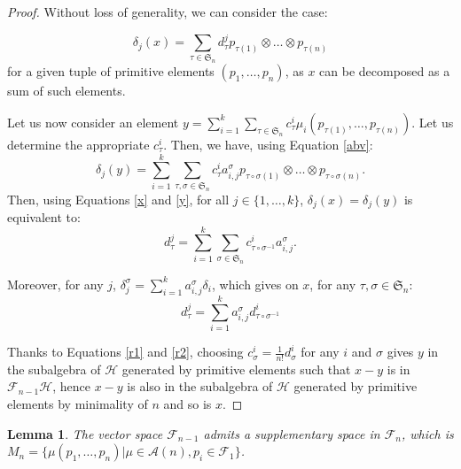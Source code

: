 \documentclass[11pt,leqno]{amsart}
\theoremstyle{definition}
\theoremstyle{plain}
\newtheorem{lemma}[definition]{Lemma}
\newcommand{\A}{ \mathcal{A} }
\newcommand{\F}{ \mathcal{F} }
\begin{document}
\begin{proof}
Without loss of generality, we can consider the case:
 
\begin{equation} \label{x}
\delta_j(x)=\sum_{\tau \in \mathfrak{S}_n} d^j_{\tau} p_{\tau(1)} \otimes \ldots \otimes p_{\tau(n)}
\end{equation}
for a given tuple of primitive elements $(p_1, \ldots, p_n)$, as $x$ can be decomposed as a sum of such elements. 


Let us now consider an element $y = \sum_{i=1}^k \sum_{\tau \in \mathfrak{S}_n} c_\tau^i \mu_i(p_{\tau(1)}, \ldots, p_{\tau(n)})$. Let us determine the appropriate $c_\tau^i$. Then, we have, using Equation \eqref{abv}:
\begin{equation} \label{y}
\delta_j(y) = \sum_{i=1}^k \sum_{\tau, \sigma \in \mathfrak{S}_n} c_\tau^i a_{i,j}^\sigma p_{\tau \circ \sigma(1)} \otimes \ldots \otimes p_{\tau \circ \sigma(n)}.
\end{equation}
Then, using Equations \eqref{x} and \eqref{y}, for all $j \in \{1, \ldots, k\}$, $\delta_j(x) = \delta_j(y)$ is equivalent to:
\begin{equation} \label{r1}
d^j_{\tau} = \sum_{i=1}^k \sum_{\sigma \in \mathfrak{S}_n} c^i_{\tau \circ \sigma^{-1}} a_{i,j}^\sigma.
\end{equation}

Moreover, for any $j$, $\delta_j^{\sigma} = \sum_{i=1}^k  a_{i,j}^\sigma \delta_i$, which gives on $x$, for any $\tau, \sigma \in \mathfrak{S}_n$:
\begin{equation} \label{r2}
d^j_\tau = \sum_{i=1}^k a_{i,j}^\sigma d^i_{\tau \circ \sigma^{-1}}
\end{equation}

Thanks to Equations \eqref{r1} and \eqref{r2}, choosing $c^i_\sigma = \frac{1}{n!} d^i_{\sigma}$ for any $i$ and $\sigma$ gives $y$ in the subalgebra of $\mathcal{H}$ generated by primitive elements such that $x-y$ is in $\F_{n-1}\mathcal{H}$, hence $x-y$ is also in the subalgebra of $\mathcal{H}$ generated by primitive elements by minimality of $n$ and so is $x$.
\end{proof}

\begin{lemma} \label{decomp} The vector space $\mathcal{F}_{n-1}$ admits a supplementary space in $\mathcal{F}_n$, which is $M_n=\{\mu(p_1, \ldots, p_n)| \mu \in \A(n), p_i \in \F_1\}$. 
\end{lemma}
\end{document}
